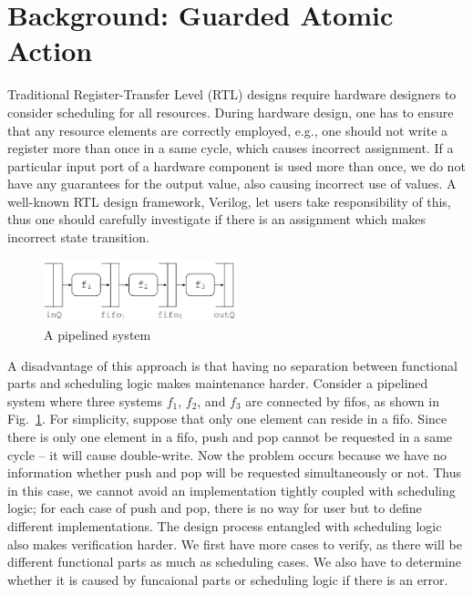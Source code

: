 \section{Background: Guarded Atomic Action}\label{sec:background}
Traditional Register-Transfer Level (RTL) designs require hardware
designers to consider scheduling for all resources. During hardware
design, one has to ensure that any resource elements are correctly
employed, e.g., one should not write a register more than once in a
same cycle, which causes incorrect assignment. If a particular input
port of a hardware component is used more than once, we do not have
any guarantees for the output value, also causing incorrect use of
values. A well-known RTL design framework, Verilog, let users take
responsibility of this, thus one should carefully investigate if there
is an assignment which makes incorrect state transition.
\begin{figure}[h]
  \centering
  \includegraphics[width=0.5\textwidth]{figures/pipeline.pdf}
  \caption{A pipelined system}
  \label{fig:pipeline}
\end{figure}

A disadvantage of this approach is that having no separation between
functional parts and scheduling logic makes maintenance
harder. Consider a pipelined system where three systems $f_1$, $f_2$,
and $f_3$ are connected by fifos, as shown in
Fig.~\ref{fig:pipeline}. For simplicity, suppose that only one element
can reside in a fifo. Since there is only one element in a fifo, push
and pop cannot be requested in a same cycle -- it will cause
double-write. Now the problem occurs because we have no information
whether push and pop will be requested simultaneously or not. Thus in
this case, we cannot avoid an implementation tightly coupled with
scheduling logic; for each case of push and pop, there is no way for
user but to define different implementations. The design process
entangled with scheduling logic also makes verification harder. We
first have more cases to verify, as there will be different functional
parts as much as scheduling cases. We also have to determine whether
it is caused by funcaional parts or scheduling logic if there is an
error.

